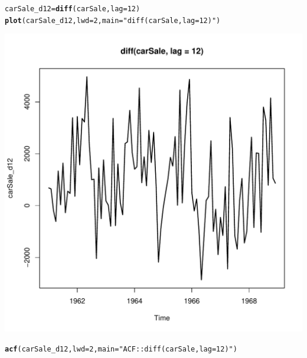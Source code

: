 \documentclass[10pt]{article}\usepackage[]{graphicx}\usepackage[]{color}
\makeatletter
\def\maxwidth{ %
  \ifdim\Gin@nat@width>\linewidth
    \linewidth
  \else
    \Gin@nat@width
  \fi
}
\newcommand{\hlnum}[1]{\textcolor[rgb]{0.686,0.059,0.569}{#1}}%
\newcommand{\hlstr}[1]{\textcolor[rgb]{0.192,0.494,0.8}{#1}}%
\newcommand{\hlstd}[1]{\textcolor[rgb]{0.345,0.345,0.345}{#1}}%
\newcommand{\hlkwb}[1]{\textcolor[rgb]{0.69,0.353,0.396}{#1}}%
\newcommand{\hlkwc}[1]{\textcolor[rgb]{0.333,0.667,0.333}{#1}}%
\newcommand{\hlkwd}[1]{\textcolor[rgb]{0.737,0.353,0.396}{\textbf{#1}}}%
\newenvironment{kframe}{%
 \def\at@end@of@kframe{}%
 \ifinner\ifhmode%
  \def\at@end@of@kframe{\end{minipage}}%
  \begin{minipage}{\columnwidth}%
 \fi\fi%
 \def\FrameCommand##1{\hskip\@totalleftmargin \hskip-\fboxsep
 \colorbox{shadecolor}{##1}\hskip-\fboxsep
     \hskip-\linewidth \hskip-\@totalleftmargin \hskip\columnwidth}%
 \MakeFramed {\advance\hsize-\width
   \@totalleftmargin\z@ \linewidth\hsize
   \@setminipage}}%
 {\par\unskip\endMakeFramed%
 \at@end@of@kframe}
\newenvironment{knitrout}{}{} %
\makeatother
\begin{document}
\begin{knitrout}
\color{fgcolor}\begin{kframe}
\begin{alltt}
\hlstd{carSale_d12} \hlkwb{=} \hlkwd{diff}\hlstd{(carSale,} \hlkwc{lag} \hlstd{=} \hlnum{12}\hlstd{)}
\hlkwd{plot}\hlstd{(carSale_d12,}\hlkwc{lwd} \hlstd{=} \hlnum{2}\hlstd{,} \hlkwc{main} \hlstd{=} \hlstr{"diff(carSale, lag = 12)"}\hlstd{)}
\end{alltt}
\end{kframe}
\includegraphics[width=\maxwidth]{figure/unnamed-chunk-33-1} 
\begin{kframe}\begin{alltt}
\hlkwd{acf}\hlstd{(carSale_d12,}\hlkwc{lwd} \hlstd{=} \hlnum{2}\hlstd{,} \hlkwc{main} \hlstd{=}\hlstr{"ACF::diff(carSale, lag = 12)"}\hlstd{)}
\end{alltt}
\end{kframe}

\end{knitrout}
\end{document}
